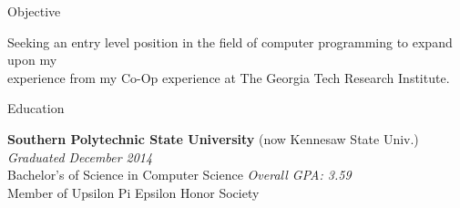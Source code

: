 \documentclass[11pt]{resume} %
\begin{document}

\begin{rSection}{Objective}

Seeking an entry level position in the field of computer programming to expand upon my \\
experience from my Co-Op experience at The Georgia Tech Research Institute.

\end{rSection}


\begin{rSection}{Education}

{\bf Southern Polytechnic State University} {\footnotesize (now Kennesaw State Univ.)} \hfill {\em Graduated December 2014} \\ 
Bachelor's of Science in Computer Science \hfill {\em Overall GPA: 3.59} \\%
Member of Upsilon Pi Epsilon Honor Society\\

\end{rSection}

\end{document}
